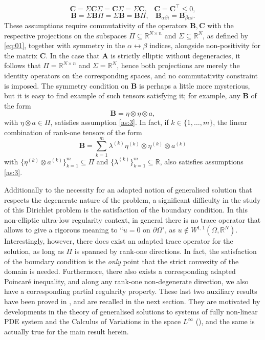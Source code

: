 \documentclass{amsart}
\numberwithin{equation}{section}
\numberwithin{thm}{section}
\theoremstyle{definition}
\def\R{\mathbb{R}}
\def\p{\mathrm{p}}
\renewcommand{\:}{\!:\!} %
\newcommand{\al}{\alpha}
\newcommand{\be}{\beta}
\newcommand{\Si}{\Sigma}
\renewcommand{\p}{\partial}
\newcommand{\sub}{\subseteq}
\newcommand{\by}{\times}
\renewcommand{\^}[1]{^{#1}_{\phantom{l}}}
\begin{document}
\begin{equation} \label{as:2}
\mathbf{C} = \Sigma \mathbf{C} \Sigma= \mathbf{C} \Sigma= \Sigma \mathbf{C}, \ \ \ \ \mathbf{C} = \mathbf{C}^\top \! \leq 0,
\end{equation}
\begin{equation} \label{as:3}
\mathbf{B} = \Sigma \mathbf{B} \Pi = \Sigma \mathbf{B} = \mathbf{B} \Pi, \ \ \ \ \mathbf{B}_{\alpha \beta i} = \mathbf{B}_{\beta \alpha i}.
\end{equation}
These assumptions require commutativity of the operators $ \mathbf{B},  \mathbf{C}$ with the respective projections on the subspaces $\Pi \sub \R^{N\by n}$ and $\Si\sub \R^N$, as defined by  \eqref{eq:01}, together with symmetry in the $\al \leftrightarrow \be$ indices, alongside non-positivity for the matrix $\mathbf{C}$. In the case that $\mathbf{A}$ is strictly elliptic without degeneracies, it follows that $\Pi = \R^{N\by n}$ and $\Si = \R^N$, hence both projections are merely the identity operators on the corresponding spaces, and no commutativity constraint is imposed. The symmetry condition on $\mathbf{B}$ is perhaps a little more mysterious, but it is easy to find example of such tensors satisfying it; for example, any $\mathbf{B}$ of the form 
\begin{equation} \label{examb:1}
\mathbf{B} = \eta \otimes \eta \otimes a,
\end{equation}
with $\eta \otimes a \in \Pi$, satisfies assumption \eqref{as:3}. In fact, if $k \in \{1, \dotsc, m\}$, the linear combination of rank-one tensors of the form 
\begin{equation} \label{examb:2}
\mathbf{B} = \sum^m_{k=1}\lambda^{(k)} \eta^{(k)} \otimes \eta^{(k)} \otimes a^{(k)}
\end{equation}
with $\{\eta^{(k)} \otimes a^{(k)}\}^m_{k=1} \sub \Pi$ and $\{\lambda^{(k)}\}^m_{k=1}\sub \R$, also satisfies assumptions \eqref{as:3}.

Additionally to the necessity for an adapted notion of generalised solution that respects the degenerate nature of the problem, a significant difficulty in the study of this Dirichlet problem is the satisfaction of the boundary condition. In this non-elliptic ultra-low regularity context, in general there is no trace operator that allows to give a rigorous meaning to ``$u=0$ on $\p\Omega$", as $u\not\in W^{1,1}(\Omega,\R^N)$. Interestingly, however, there does exist an adapted trace operator for the solution, as long as $\Pi$ is spanned by rank-one directions. In fact, the satisfaction of the boundary condition is the {\it only} point that the strict convexity of the domain is needed. Furthermore, there also exists a corresponding adapted Poincar\'e inequality, and along any rank-one non-degenerate direction, we also have a corresponding partial regularity property. These last two auxiliary results have been proved in \cite{nikos1}, and are recalled in the next section. They are motivated by developments in the theory of generalised solutions to systems of fully non-linear PDE system and the Calculus of Variations in the space $L^\infty$ (\cite{K1, K2, K4}), and the same is actually true for the main result herein.
\end{document}
